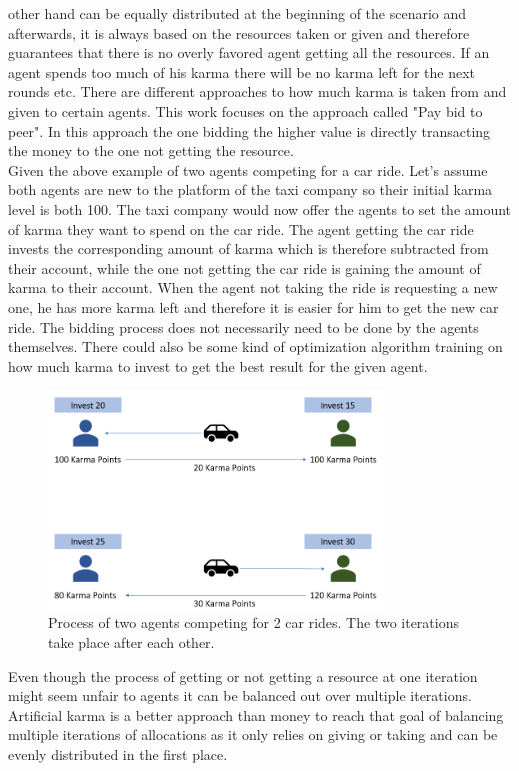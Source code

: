 \documentclass[german, a4paper, 11pt, oneside]{scrbook}
\begin{document}
other hand can be equally distributed at the beginning of the scenario and afterwards, it is always based on the resources taken or given and therefore guarantees that there is no overly favored agent getting all the resources. If an agent spends too much of his karma there will be no karma left for the next rounds etc.  \cite{Elokda.2023}
There are different approaches to how much karma is taken from and given to certain agents. This work focuses on the approach called "Pay bid to peer". In this approach the one bidding the higher value is directly transacting the money to the one not getting the resource. \cite{Elokda.2023} \\Given the above example of two agents competing for a car ride. Let's assume both agents are new to the platform of the taxi company so their initial karma level is both 100. The taxi company would now offer the agents to set the amount of karma they want to spend on the car ride. The agent getting the car ride invests the corresponding amount of karma which is therefore subtracted from their account, while the one not getting the car ride is gaining the amount of karma to their account. When the agent not taking the ride is requesting a new one, he has more karma left and therefore it is easier for him to get the new car ride. The bidding process does not necessarily need to be done by the agents themselves. There could also be some kind of optimization algorithm training on how much karma to invest to get the best result for the given agent.
\begin{figure}[h]
\centering
\includegraphics[width=0.8\textwidth]{AK}
\caption{Process of two agents competing for 2 car rides. The two iterations take place after each other.}
\end{figure}
Even though the process of getting or not getting a resource at one iteration might seem unfair to agents it can be balanced out over multiple iterations. Artificial karma is a better approach than money to reach that goal of balancing multiple iterations of allocations as it only relies on giving or taking and can be evenly distributed in the first place. \cite{Elokda.2023}
\end{document}
